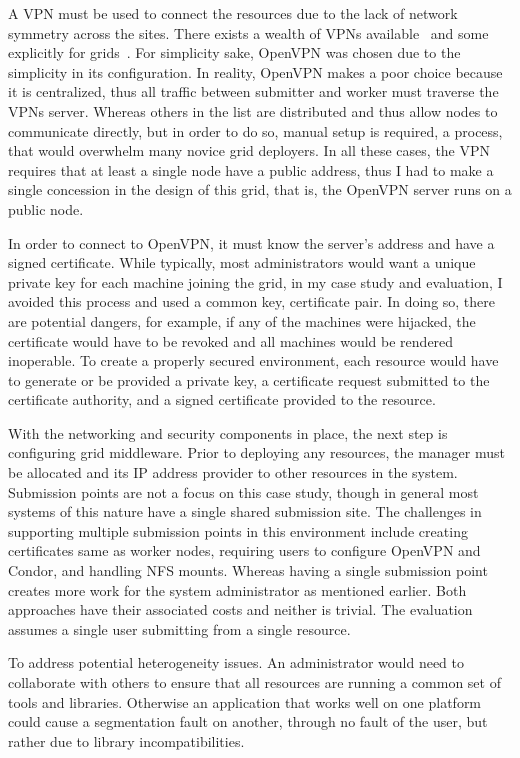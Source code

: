 A VPN must be used to connect the resources due to the lack of network symmetry
across the sites.  There exists a wealth of VPNs available~\cite{hamachi,
openvpn, tinc} and some explicitly for grids~\cite{violin, vine, vnet}.  For
simplicity sake, OpenVPN was chosen due to the simplicity in its configuration.
In reality, OpenVPN makes a poor choice because it is centralized, thus all
traffic between submitter and worker must traverse the VPNs server.  Whereas
others in the list are distributed and thus allow nodes to communicate
directly, but in order to do so, manual setup is required, a process, that
would overwhelm many novice grid deployers.  In all these cases, the VPN
requires that at least a single node have a public address, thus I had to make
a single concession in the design of this grid, that is, the OpenVPN server
runs on a public node.

In order to connect to OpenVPN, it must know the server's address and have a
signed certificate.  While typically, most administrators would want a unique
private key for each machine joining the grid, in my case study and
evaluation, I avoided this process and used a common key, certificate pair.  In
doing so, there are potential dangers, for example, if any of the machines were
hijacked, the certificate would have to be revoked and all machines would be
rendered inoperable.  To create a properly secured environment, each resource
would have to generate or be provided a private key, a certificate request
submitted to the certificate authority, and a signed certificate provided to
the resource.

With the networking and security components in place, the next step is
configuring grid middleware.  Prior to deploying any resources, the manager
must be allocated and its IP address provider to other resources in the system.
Submission points are not a focus on this case study, though in general most
systems of this nature have a single shared submission site.  The challenges in
supporting multiple submission points in this environment include creating
certificates same as worker nodes,  requiring users to configure OpenVPN and
Condor, and handling NFS mounts.  Whereas having a single submission point
creates more work for the system administrator as mentioned earlier.  Both
approaches have their associated costs and neither is trivial.  The evaluation
assumes a single user submitting from a single resource.

To address potential heterogeneity issues.  An administrator would need to
collaborate with others to ensure that all resources are running a common set
of tools and libraries.  Otherwise an application that works well on one
platform could cause a segmentation fault on another, through no fault of the
user, but rather due to library incompatibilities. 

